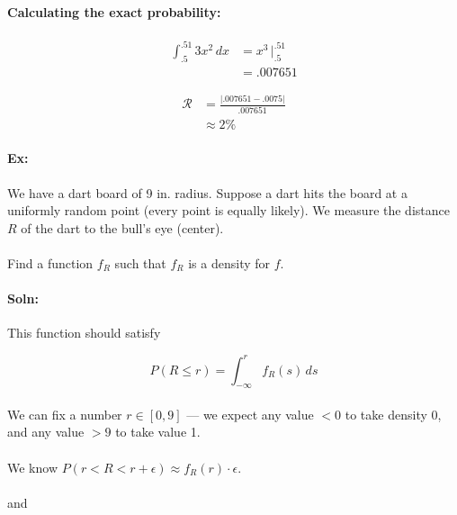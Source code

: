 \documentclass{article}
\begin{document}
    \paragraph{Calculating the exact probability:}
    \begin{align*}
        \int_{.5}^{.51} 3x^2 \,dx &= x^3 \, \big|_{.5}^{.51}\\
                                  &= .007651
    \end{align*}
    
    \begin{align*}
        \mathcal{R} &= \frac{\lvert .007651 - .0075 \rvert}{.007651}\\
                    &\approx 2\%
    \end{align*}
    \paragraph{Ex:} We have a dart board of 9 in. radius. Suppose a dart hits the board at a uniformly random point
    (every point is equally likely). We measure the distance $R$ of the dart to the bull's eye (center).

    \paragraph{}Find a function $f_R$ such that $f_R$ is a density for $f$.
    \paragraph{Soln:}This function should satisfy
    
    \[
        P(R \le r) = \int_{-\infty}^{r}f_R(s)\,ds
    \]

    \paragraph{}We can fix a number $r \in [0,9]$ --- we expect any value $< 0$ to take density 0, and any
    value $> 9$ to take value 1.

    \paragraph{}We know $P(r < R < r + \epsilon) \approx f_R(r)\cdot \epsilon$.
    \paragraph{}and 
    
\end{document}
